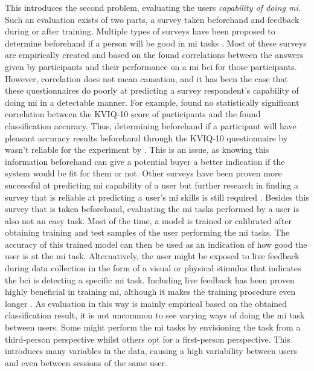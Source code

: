 This introduces the second problem, evaluating the users \textit{capability of doing \gls{mi}}.
Such an evaluation exists of two parts, a survey taken beforehand and feedback during or after training.
Multiple types of surveys have been proposed to determine beforehand if a person will be good in \gls{mi} tasks \citep{kviq, mi_survey_miqrs, mi_survey1, mi_survey2, mi_capability_review}.
Most of these surveys are empirically created and based on the found correlations between the answers given by participants and their performance on a \gls{mi} \gls{bci} for those participants.
However, correlation does not mean causation, and it has been the case that these questionnaires do poorly at predicting a survey respondent's capability of doing \gls{mi} in a detectable manner.
For example, \citet{cheap_bci_feasibility} found no statistically significant correlation between the KVIQ-10 score of participants and the found classification accuracy.
Thus, determining beforehand if a participant will have pleasant accuracy results beforehand through the KVIQ-10 questionnaire by \citet{kviq} wasn't reliable for the experiment by \citet{cheap_bci_feasibility}.
This is an issue, as knowing this information beforehand can give a potential buyer a better indication if the system would be fit for them or not.
Other surveys have been proven more successful at predicting \gls{mi} capability of a user but further research in finding a survey that is reliable at predicting a user's \gls{mi} skills is still required \citep{mi_capability_review}.
Besides this survey that is taken beforehand, evaluating the \gls{mi} tasks performed by a user is also not an easy task.
Most of the time, a model is trained or calibrated after obtaining training and test samples of the user performing the \gls{mi} tasks.
The accuracy of this trained model can then be used as an indication of how good the user is at the \gls{mi} task.
Alternatively, the user might be exposed to live feedback during data collection in the form of a visual or physical stimulus that indicates the \gls{bci} is detecting a specific \gls{mi} task.
Including live feedback has been proven highly beneficial in training \gls{mi}, although it makes the training procedure even longer \citep{mi_training_hard}.
As evaluation in this way is mainly empirical based on the obtained classification result, it is not uncommon to see varying ways of doing the \gls{mi} task between users.
Some might perform the \gls{mi} tasks by envisioning the task from a third-person perspective whilst others opt for a first-person perspective.
This introduces many variables in the data, causing a high variability between users and even between sessions of the same user.
